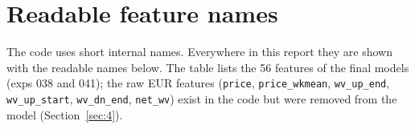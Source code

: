 \section{Readable feature names}\label{sec:A}

The code uses short internal names. Everywhere in this report they are shown with the readable names below. The table lists the 56 features of the final models (exps 038 and 041); the raw EUR features (\texttt{price}, \texttt{price\_wkmean}, \texttt{wv\_up\_end}, \texttt{wv\_up\_start}, \texttt{wv\_dn\_end}, \texttt{net\_wv}) exist in the code but were removed from the model (Section~\ref{sec:4}).

{\small
  \def\tablecaption{The features of the final models: internal name, readable name, family and meaning}
  
}
